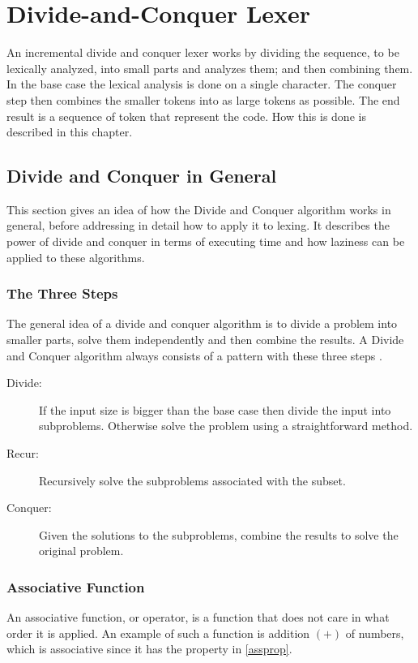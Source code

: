 \chapter{Divide-and-Conquer Lexer}
An incremental divide and conquer lexer works by dividing the sequence, to be
lexically analyzed, into small parts and analyzes them; and then combining them.
In the base case the lexical analysis is done on a single character. The
conquer step then combines the smaller tokens into as large tokens as possible.
The end result is a sequence of token that represent the code. How this is done
is described in this chapter.

\section{Divide and Conquer in General}
This section gives an idea of how the Divide and Conquer algorithm
works in general, before addressing in detail how to apply it to lexing. It
describes the power of divide and conquer in terms of executing time and how
laziness can be applied to these algorithms.

\subsection{The Three Steps}
The general idea of a divide and conquer algorithm is to divide a problem into
smaller parts, solve them independently and then combine the results. A Divide
and Conquer algorithm always consists of a pattern with these three steps
\cite{Goodrich}.
\begin{description}
\item[Divide:] If the input size is bigger than the base case then divide the
input into subproblems. Otherwise solve the problem using a straightforward
method.
\item[Recur:] Recursively solve the subproblems associated with the subset.
\item[Conquer:] Given the solutions to the subproblems, combine the results to
solve the original problem.
\end{description}

\subsection{Associative Function}
An associative function, or operator, is a function that does not care in what
order it is applied. An example of such a function is addition $(+)$ of numbers,
which is associative since it has the property in \cref{assprop}.

